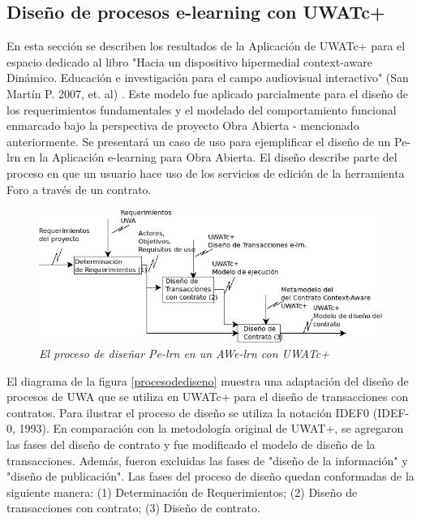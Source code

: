 \subsection {Diseño de procesos e-learning con UWATc+} \label{diseno7}

En esta sección se describen los resultados de la Aplicación de UWATc+ para el
espacio dedicado al libro "Hacia un dispositivo hipermedial context-aware
Dinámico. Educación e investigación para el campo audiovisual interactivo" (San
Martín P. 2007, et. al) \cite{libro}.  Este  modelo fue aplicado parcialmente
para el diseño de los requerimientos fundamentales y el modelado del
comportamiento funcional enmarcado bajo la perspectiva de proyecto Obra Abierta
- mencionado anteriormente. Se presentará un caso de uso para ejemplificar el
diseño de un Pe-lrn en la Aplicación e-learning para Obra Abierta. El diseño
describe parte del proceso en que un usuario hace uso de los servicios de
edición de la herramienta Foro a través de un contrato. 

	\begin{figure}[!h]
        \begin{center}
	\includegraphics[width=6 in,totalheight=2.5 in]{Ch7/procesodisenoNuevo.jpeg}
	\caption{\small \sl El proceso de diseñar Pe-lrn en un AWe-lrn con UWATc+} \label{procesodediseno7}
         \end{center}
         \end{figure}



El diagrama de la figura \ref{procesodediseno} muestra una adaptación del diseño
de procesos de UWA \cite{UWA} que se utiliza en UWATc+ para el diseño de
transacciones con contratos. Para ilustrar el proceso de diseño se utiliza la
notación IDEF0 (IDEF-0, 1993). En comparación con la metodología original de
UWAT+, se agregaron las fases del diseño de contrato y fue modificado el modelo
de diseño de la transacciones. Además, fueron excluidas las fases de "diseño de
la información" y "diseño de publicación". Las fases del proceso de diseño
quedan conformadas de la siguiente manera: (1) Determinación de Requerimientos;
(2) Diseño de transacciones con contrato; (3) Diseño de contrato.

